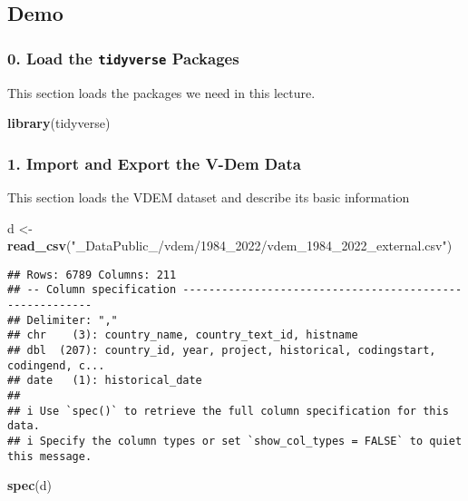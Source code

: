 \documentclass[
]{article}
\newenvironment{Shaded}{\begin{snugshade}}{\end{snugshade}}
\newcommand{\FunctionTok}[1]{\textcolor[rgb]{0.13,0.29,0.53}{\textbf{#1}}}
\newcommand{\NormalTok}[1]{#1}
\newcommand{\OtherTok}[1]{\textcolor[rgb]{0.56,0.35,0.01}{#1}}
\newcommand{\StringTok}[1]{\textcolor[rgb]{0.31,0.60,0.02}{#1}}
\begin{document}
\hypertarget{demo}{%
\subsection{Demo}\label{demo}}

\hypertarget{load-the-tidyverse-packages}{%
\subsubsection{\texorpdfstring{0. Load the \texttt{tidyverse}
Packages}{0. Load the tidyverse Packages}}\label{load-the-tidyverse-packages}}

This section loads the packages we need in this lecture.

\begin{Shaded}
\begin{Highlighting}[]
\FunctionTok{library}\NormalTok{(tidyverse)}
\end{Highlighting}
\end{Shaded}

\hypertarget{import-and-export-the-v-dem-data}{%
\subsubsection{1. Import and Export the V-Dem
Data}\label{import-and-export-the-v-dem-data}}

This section loads the VDEM dataset and describe its basic information

\begin{Shaded}
\begin{Highlighting}[]
\NormalTok{d }\OtherTok{\textless{}{-}} \FunctionTok{read\_csv}\NormalTok{(}\StringTok{"\_DataPublic\_/vdem/1984\_2022/vdem\_1984\_2022\_external.csv"}\NormalTok{)}
\end{Highlighting}
\end{Shaded}

\begin{verbatim}
## Rows: 6789 Columns: 211
## -- Column specification --------------------------------------------------------
## Delimiter: ","
## chr    (3): country_name, country_text_id, histname
## dbl  (207): country_id, year, project, historical, codingstart, codingend, c...
## date   (1): historical_date
## 
## i Use `spec()` to retrieve the full column specification for this data.
## i Specify the column types or set `show_col_types = FALSE` to quiet this message.
\end{verbatim}

\begin{Shaded}
\begin{Highlighting}[]
\FunctionTok{spec}\NormalTok{(d)}
\end{Highlighting}
\end{Shaded}
\end{document}

